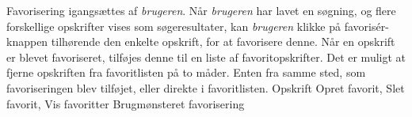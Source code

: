 {Favorisering igangsættes af \textit{brugeren}. Når \textit{brugeren} har lavet en søgning, og flere forskellige opskrifter vises som søgeresultater, kan \textit{brugeren} klikke på favorisér-knappen tilhørende den enkelte opskrift, for at favorisere denne. Når en opskrift er blevet favoriseret, tilføjes denne til en liste af favoritopskrifter. Det er muligt at fjerne opskriften fra favoritlisten på to måder. Enten fra samme sted, som favoriseringen blev tilføjet, eller direkte i favoritlisten.}
{Opskrift}
{Opret favorit, Slet favorit, Vis favoritter}
{Brugmønsteret favorisering}
